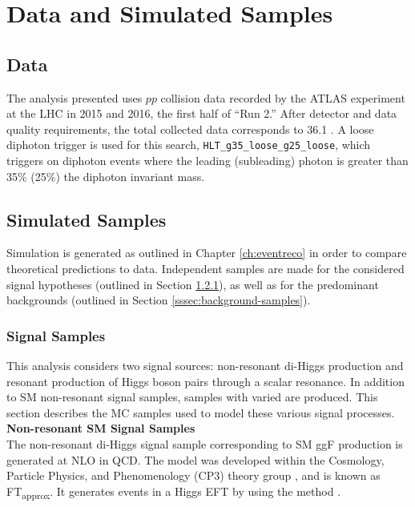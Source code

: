 \section{Data and Simulated Samples}


\subsection{Data}

The analysis presented uses $pp$ collision data recorded by the ATLAS experiment at the LHC in 2015 and 2016, the first half of ``Run 2.'' After detector and data quality requirements, the total collected data corresponds to 36.1 \ifb. A loose diphoton trigger is used for this search, \texttt{HLT\_g35\_loose\_g25\_loose}, which triggers on diphoton events where the leading (subleading) photon \pt is greater than 35\% (25\%) the diphoton invariant mass.

\subsection{Simulated Samples}

Simulation is generated as outlined in Chapter \ref{ch:eventreco} in order to compare theoretical predictions to data. Independent samples are made for the considered signal hypotheses (outlined in Section \ref{sssec:signal-samples}), as well as for the predominant backgrounds (outlined in Section \ref{sssec:background-samples}).

\subsubsection{Signal Samples} \label{sssec:signal-samples}

This analysis considers two signal sources: non-resonant di-Higgs production and resonant production of Higgs boson pairs through a scalar resonance. In addition to \gls{SM} non-resonant signal samples, samples with varied \klambda are produced. This section describes the \gls{MC} samples used to model these various signal processes.\\

\noindent\textbf{Non-resonant \gls{SM} Signal Samples}\\
\indent The non-resonant di-Higgs signal sample corresponding to \gls{SM} \gls{ggF} \hh production is generated at \gls{NLO} in \gls{QCD}. The model was developed within the Cosmology, Particle Physics, and Phenomenology (CP3) theory group \cite{top-quark-massrw}, and is known as FT\textsubscript{approx}. It generates events in a Higgs \gls{EFT} by using the \AMCatNLO method \cite{amc-at-nlo}.

